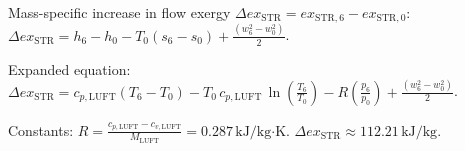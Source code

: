 Mass-specific increase in flow exergy \( \Delta ex_{\text{STR}} = ex_{\text{STR},6} - ex_{\text{STR},0} \):  
\( \Delta ex_{\text{STR}} = h_6 - h_0 - T_0 (s_6 - s_0) + \frac{(w_6^2 - w_0^2)}{2} \).  

Expanded equation:  
\( \Delta ex_{\text{STR}} = c_{p,\text{LUFT}} (T_6 - T_0) - T_0 \, c_{p,\text{LUFT}} \, \ln \left( \frac{T_6}{T_0} \right) - R \left( \frac{p_6}{p_0} \right) + \frac{(w_6^2 - w_0^2)}{2} \).  

Constants:  
\( R = \frac{c_{p,\text{LUFT}} - c_{v,\text{LUFT}}}{M_{\text{LUFT}}} = 0.287 \, \text{kJ/kg·K} \).  
\( \Delta ex_{\text{STR}} \approx 112.21 \, \text{kJ/kg} \).